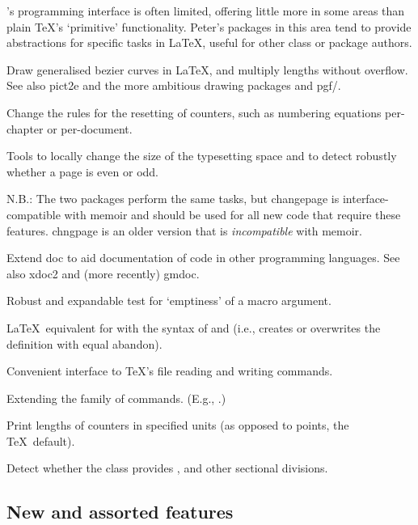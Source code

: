 \documentclass[final]{ltugboat}
\begin{document}
\LaTeXe's programming interface is often limited, offering little more in some areas than plain \TeX's `primitive' functionality. Peter's packages in this area tend to provide abstractions for specific tasks in \LaTeX, useful for other class or package authors.

\begin{description}[font=\normalfont\sffamily]
\item [bez123 \& multiply] Draw generalised bezier curves in \LaTeX, and multiply lengths without overflow. See also \textsf{pict2e} and the more ambitious drawing packages \textsf{\PSTricks} and \textsf{pgf/\TikZ}.

\item [chngcntr] Change the rules for the resetting of counters, such as numbering equations per-chapter or per-document.
\item [chngpage \& changepage] Tools to locally change the size of the typesetting space and to detect robustly whether a page is even or odd.

N.B.: The two packages perform the same tasks, but \textsf{changepage} is interface-compatible with \textsf{memoir} and should be used for all new code that require these features. \textsf{chngpage} is an older version that is \emph{incompatible} with \textsf{memoir}.

\item [docmfp] Extend \textsf{doc} to aid documentation of code in other programming languages. See also \textsf{xdoc2} and (more recently) \textsf{gmdoc}.

\item [ifmtarg] Robust and expandable test for `emptiness' of a macro argument.
\item [makecmds] \LaTeX\ equivalent for  with the syntax of  and  (i.e., creates or overwrites the definition with equal abandon).
\item [newfile]  Convenient interface to \TeX's file reading and writing commands.
\item [nextpage] Extending the family of  commands. (E.g., .)
\item [printlen] Print lengths of counters in specified units (as opposed to points, the \TeX\ default).
\item [stdclsdv] Detect whether the class provides , and other sectional divisions.
\end{description}

\subsection{New and assorted features}
\end{document}
